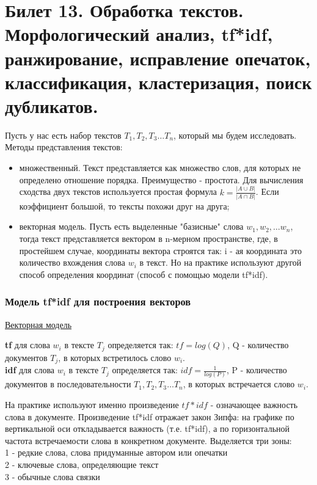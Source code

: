\newpage
\section {Билет 13. Обработка текстов. Морфологический анализ, tf*idf, ранжирование, исправление опечаток, классификация, кластеризация, поиск дубликатов.}

Пусть у нас есть набор текстов $T_1, T_2, T_3 \dots T_n$, который мы будем исследовать. \\
Методы представления текстов:
\begin{itemize}
\item множественный. Текст представляется как множество слов, для которых не определено отношение порядка. Преимущество - простота. Для вычисления сходства двух текстов используется простая формула $k = \frac {|A \cup B|}{|A \cap B|}$. Если коэффициент большой, то тексты похожи друг на друга;
\item векторная модель. Пусть есть выделенные  "базисные" слова $w_1, w_2, \dots w_n$, тогда текст представляется вектором в n-мерном пространстве, где, в простейшем случае, координаты вектора строятся так: i - ая координата это количество вхождения слова $w_i$ в текст. Но на практике используют другой способ определения координат (способ с помощью модели tf*idf).
\end{itemize}

\subsubsection {Модель tf*idf для построения векторов}
\href{https://clck.ru/EqWAS}{Векторная модель} 
\begin{defn}
\textbf{tf} для слова $w_i$ в тексте $T_j$ определяется так: 
 $tf = log (Q)$, Q - количество документов $T_j$, в которых встретилось слово $w_i$.  \\
\textbf{idf} для слова $w_i$ в тексте $T_j$ определяется так: 
$idf = \frac{1}{log(P)}$, P - количество документов в последовательности $T_1, T_2, T_3 \dots T_n$, в которых встречается слово $w_i$. 
\end{defn}
На практике используют именно произведение $tf*idf$ - означающее важность слова в документе. Произведение tf*idf отражает закон Зипфа:
на графике по вертикальной оси откладывается важность (т.е. tf*idf), а по горизонтальной частота встречаемости слова в конкретном документе. 
Выделяется три зоны: \\
1 - редкие слова, слова придуманные автором или опечатки \\
2 - ключевые слова, определяющие текст \\
3 - обычные слова связки \\

